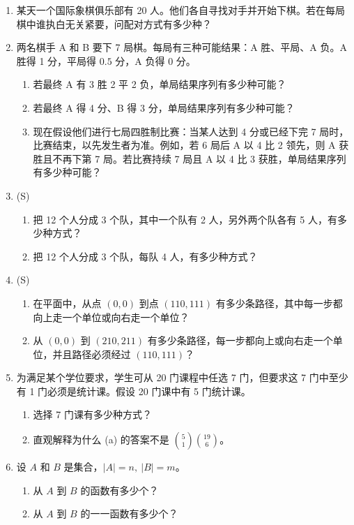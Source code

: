 \documentclass[UTF8, 12pt, fontset=fandol, oneside]{ctexart}
\begin{document}
\begin{enumerate}
  \item 某天一个国际象棋俱乐部有 20 人。他们各自寻找对手并开始下棋。若在每局棋中谁执白无关紧要，问配对方式有多少种？

  \item 两名棋手 A 和 B 要下 7 局棋。每局有三种可能结果：A 胜、平局、A 负。A 胜得 1 分，平局得 $0.5$ 分，A 负得 0 分。
  \begin{enumerate}
    \item 若最终 A 有 3 胜 2 平 2 负，单局结果序列有多少种可能？
    \item 若最终 A 得 4 分、B 得 3 分，单局结果序列有多少种可能？
    \item 现在假设他们进行七局四胜制比赛：当某人达到 4 分或已经下完 7 局时，比赛结束，以先发生者为准。例如，若 6 局后 A 以 4 比 2 领先，则 A 获胜且不再下第 7 局。若比赛持续 7 局且 A 以 4 比 3 获胜，单局结果序列有多少种可能？
  \end{enumerate}

  \item (S)
  \begin{enumerate}
    \item 把 12 个人分成 3 个队，其中一个队有 2 人，另外两个队各有 5 人，有多少种方式？
    \item 把 12 个人分成 3 个队，每队 4 人，有多少种方式？
  \end{enumerate}

  \item (S)
  \begin{enumerate}
    \item 在平面中，从点 $(0,0)$ 到点 $(110,111)$ 有多少条路径，其中每一步都向上走一个单位或向右走一个单位？
    \item 从 $(0,0)$ 到 $(210,211)$ 有多少条路径，每一步都向上或向右走一个单位，并且路径必须经过 $(110,111)$？
  \end{enumerate}

  \item 为满足某个学位要求，学生可从 20 门课程中任选 7 门，但要求这 7 门中至少有 1 门必须是统计课。假设 20 门课中有 5 门统计课。
  \begin{enumerate}
    \item 选择 7 门课有多少种方式？
    \item 直观解释为什么 (a) 的答案不是 $\binom51\binom{19}{6}$。
  \end{enumerate}

  \item 设 $A$ 和 $B$ 是集合，$|A|=n,\ |B|=m$。
  \begin{enumerate}
    \item 从 $A$ 到 $B$ 的函数有多少个？
    \item 从 $A$ 到 $B$ 的一一函数有多少个？
  \end{enumerate}


\end{enumerate}
\end{document}
